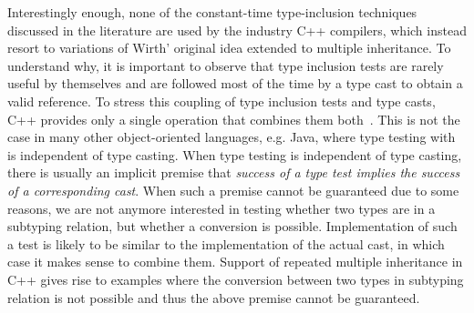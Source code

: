 Interestingly enough, none of the constant-time type-inclusion techniques 
discussed in the literature are used by the industry C++ compilers, which
instead resort to variations of Wirth' original idea extended to multiple 
inheritance. To understand why, it is important to observe that type inclusion 
tests are rarely useful by themselves and are followed most of the time by a 
type cast to obtain a valid reference. To stress this coupling of type inclusion 
tests and type casts, C++ provides only a single operation  
that combines them both~\cite[.2]{Str94}. This is not the case 
in many other object-oriented languages, e.g. Java, where type testing with 
 is independent of type casting. When type testing is 
independent of type casting, there is usually an implicit premise that 
\emph{success of a type test implies the success of a corresponding cast}. When 
such a premise cannot be guaranteed due to some reasons, we are not anymore 
interested in testing whether two types are in a subtyping relation, but whether 
a conversion is possible. Implementation of such a test is likely to be similar 
to the implementation of the actual cast, in which case it makes sense to 
combine them. Support of repeated multiple inheritance in C++ gives rise to 
examples where the conversion between two types in subtyping relation is not 
possible and thus the above premise cannot be guaranteed.  



